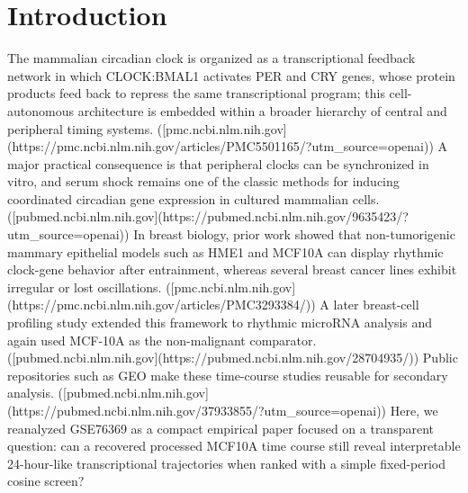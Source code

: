 \documentclass[11pt]{article}
\begin{document}
\section{Introduction}
The mammalian circadian clock is organized as a transcriptional feedback network in which CLOCK:BMAL1 activates PER and CRY genes, whose protein products feed back to repress the same transcriptional program; this cell-autonomous architecture is embedded within a broader hierarchy of central and peripheral timing systems. ([pmc.ncbi.nlm.nih.gov](https://pmc.ncbi.nlm.nih.gov/articles/PMC5501165/?utm\_source=openai)) A major practical consequence is that peripheral clocks can be synchronized in vitro, and serum shock remains one of the classic methods for inducing coordinated circadian gene expression in cultured mammalian cells. ([pubmed.ncbi.nlm.nih.gov](https://pubmed.ncbi.nlm.nih.gov/9635423/?utm\_source=openai)) In breast biology, prior work showed that non-tumorigenic mammary epithelial models such as HME1 and MCF10A can display rhythmic clock-gene behavior after entrainment, whereas several breast cancer lines exhibit irregular or lost oscillations. ([pmc.ncbi.nlm.nih.gov](https://pmc.ncbi.nlm.nih.gov/articles/PMC3293384/)) A later breast-cell profiling study extended this framework to rhythmic microRNA analysis and again used MCF-10A as the non-malignant comparator. ([pubmed.ncbi.nlm.nih.gov](https://pubmed.ncbi.nlm.nih.gov/28704935/)) Public repositories such as GEO make these time-course studies reusable for secondary analysis. ([pubmed.ncbi.nlm.nih.gov](https://pubmed.ncbi.nlm.nih.gov/37933855/?utm\_source=openai)) Here, we reanalyzed GSE76369 as a compact empirical paper focused on a transparent question: can a recovered processed MCF10A time course still reveal interpretable 24-hour-like transcriptional trajectories when ranked with a simple fixed-period cosine screen?
\end{document}
